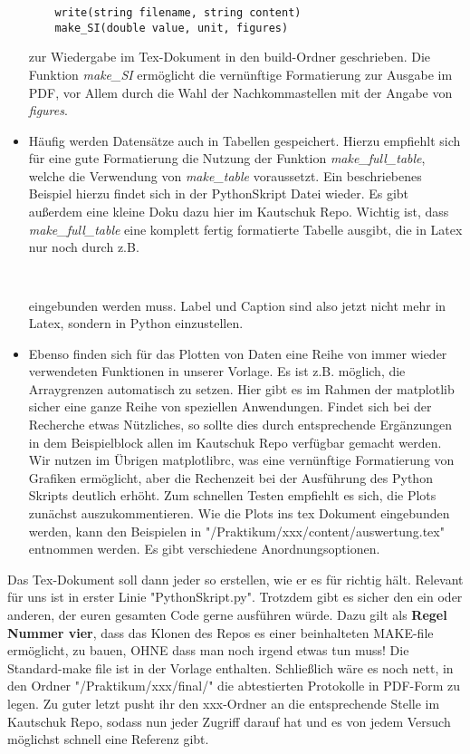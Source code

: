 \begin{itemize}
  \begin{lstlisting}
    write(string filename, string content)
    make_SI(double value, unit, figures)
  \end{lstlisting}
  zur Wiedergabe im Tex-Dokument in den build-Ordner geschrieben. Die Funktion \emph{make\_SI} ermöglicht die vernünftige Formatierung zur Ausgabe im PDF, vor Allem durch die Wahl der Nachkommastellen mit der Angabe von \emph{figures}.
  \item Häufig werden Datensätze auch in Tabellen gespeichert. Hierzu empfiehlt sich für eine gute Formatierung die Nutzung der Funktion \emph{make\_full\_table}, welche die Verwendung von \emph{make\_table} voraussetzt. Ein beschriebenes Beispiel hierzu findet sich in der PythonSkript Datei wieder. Es gibt außerdem eine kleine Doku dazu hier im Kautschuk Repo. Wichtig ist, dass \emph{make\_full\_table} eine komplett fertig formatierte Tabelle ausgibt, die in Latex nur noch durch z.B.
  \begin{lstlisting}
    
  \end{lstlisting}
  eingebunden werden muss. Label und Caption sind also jetzt nicht mehr in Latex, sondern in Python einzustellen.
  \item Ebenso finden sich für das Plotten von Daten eine Reihe von immer wieder verwendeten Funktionen in unserer Vorlage. Es ist z.B. möglich, die Arraygrenzen automatisch zu setzen. Hier gibt es im Rahmen der matplotlib sicher eine ganze Reihe von speziellen Anwendungen. Findet sich bei der Recherche etwas Nützliches, so sollte dies durch entsprechende Ergänzungen in dem Beispielblock allen im Kautschuk Repo verfügbar gemacht werden. Wir nutzen im Übrigen matplotlibrc, was eine vernünftige Formatierung von Grafiken ermöglicht, aber die Rechenzeit bei der Ausführung des Python Skripts deutlich erhöht. Zum schnellen Testen empfiehlt es sich, die Plots zunächst auszukommentieren. Wie die Plots ins tex Dokument eingebunden werden, kann den Beispielen in "/Praktikum/xxx/content/auswertung.tex" entnommen werden. Es gibt verschiedene Anordnungsoptionen.
\end{itemize}
Das Tex-Dokument soll dann jeder so erstellen, wie er es für richtig hält. Relevant für uns ist in erster Linie "PythonSkript.py". Trotzdem gibt es sicher den ein oder anderen, der euren gesamten Code gerne ausführen würde. Dazu gilt als \textbf{Regel Nummer vier}, dass das Klonen des Repos es einer beinhalteten MAKE-file ermöglicht, zu bauen, OHNE dass man noch irgend etwas tun muss! Die Standard-make file ist in der Vorlage enthalten. Schließlich wäre es noch nett, in den Ordner "/Praktikum/xxx/final/" die abtestierten Protokolle in PDF-Form zu legen. Zu guter letzt pusht ihr den xxx-Ordner an die entsprechende Stelle im Kautschuk Repo, sodass nun jeder Zugriff darauf hat und es von jedem Versuch möglichst schnell eine Referenz gibt.
